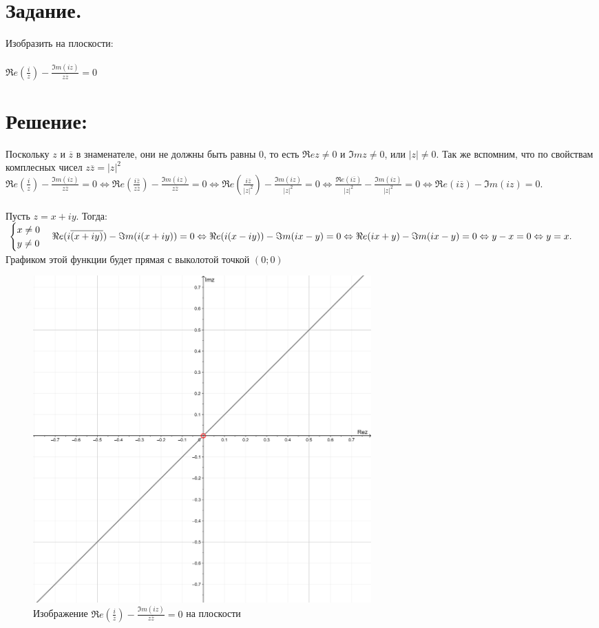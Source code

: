 \documentclass[12pt, a4paper]{article}
\begin{document}
\section{Задание.}
    Изобразить на плоскости:\\\\
    $\Re e(\frac{i}{z}) - \frac{\Im m(iz)}{z\overline{z}} = 0$
    \section*{Решение:}
    Поскольку $z$ и $\overline{z}$ в знаменателе, они не должны быть равны 0,
    то есть $\Re ez \neq 0$ и $\Im mz \neq 0$, или $|z| \neq 0$.\newline
    Так же вспомним, что по свойствам комплесных чисел $z\overline{z} = |z|^2$\newline
    \begin{math} 
        \Re e(\frac{i}{z}) - \frac{\Im m(iz)}{z\overline{z}} = 0 \Leftrightarrow
        \Re e(\frac{i\overline{z}}{z\overline{z}}) - \frac{\Im m(iz)}{z\overline{z}} = 0 \Leftrightarrow
        \Re e(\frac{i\overline{z}}{|z|^2}) - \frac{\Im m(iz)}{|z|^2} = 0 \Leftrightarrow
        \frac{\Re e(i\overline{z})}{|z|^2} - \frac{\Im m(iz)}{|z|^2} = 0 \Leftrightarrow
        \Re e(i\overline{z}) - \Im m(iz) = 0.
    \end{math} \\\\
    Пусть $z = x + iy$. Тогда:\\
    \begin{math}
        \begin{cases}
            x \neq 0\\
            y \neq 0
        \end{cases}\\
        \Re e(i\overline{(x + iy)}) - \Im m(i(x + iy)) = 0 \Leftrightarrow
        \Re e(i(x - iy)) - \Im m(ix - y) = 0 \Leftrightarrow
        \Re e(ix + y) - \Im m(ix - y) = 0 \Leftrightarrow
        y - x = 0 \Leftrightarrow
        y = x.
    \end{math}\\
    Графиком этой функции будет прямая с выколотой точкой $(0;0)$
    \begin{figure}[h]
        \centering
        \includegraphics[width=0.63\textwidth]{task2-a.png}
        \caption{Изображение $\Re e(\frac{i}{z}) - \frac{\Im m(iz)}{z\overline{z}} = 0$ на плоскости}
    \end{figure}
\end{document}

